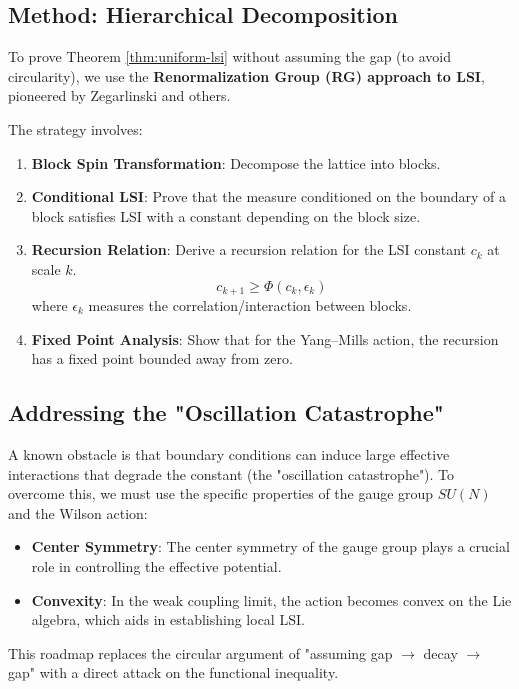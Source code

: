\subsection{Method: Hierarchical Decomposition}

To prove Theorem \ref{thm:uniform-lsi} without assuming the gap (to avoid circularity), we use the \textbf{Renormalization Group (RG) approach to LSI}, pioneered by Zegarlinski and others.

The strategy involves:
\begin{enumerate}
    \item \textbf{Block Spin Transformation}: Decompose the lattice into blocks.
    \item \textbf{Conditional LSI}: Prove that the measure conditioned on the boundary of a block satisfies LSI with a constant depending on the block size.
    \item \textbf{Recursion Relation}: Derive a recursion relation for the LSI constant $c_k$ at scale $k$.
    \[
    c_{k+1} \ge \Phi(c_k, \epsilon_k)
    \]
    where $\epsilon_k$ measures the correlation/interaction between blocks.
    \item \textbf{Fixed Point Analysis}: Show that for the Yang--Mills action, the recursion has a fixed point bounded away from zero.
\end{enumerate}

\subsection{Addressing the "Oscillation Catastrophe"}

A known obstacle is that boundary conditions can induce large effective interactions that degrade the constant (the "oscillation catastrophe").
To overcome this, we must use the specific properties of the gauge group $SU(N)$ and the Wilson action:
\begin{itemize}
    \item \textbf{Center Symmetry}: The center symmetry of the gauge group plays a crucial role in controlling the effective potential.
    \item \textbf{Convexity}: In the weak coupling limit, the action becomes convex on the Lie algebra, which aids in establishing local LSI.
\end{itemize}

This roadmap replaces the circular argument of "assuming gap $\to$ decay $\to$ gap" with a direct attack on the functional inequality.



